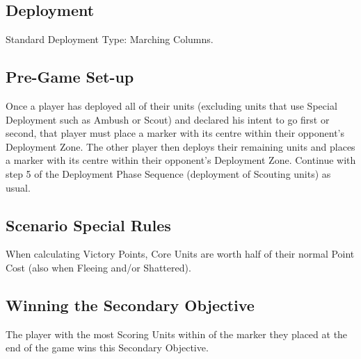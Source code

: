 
\label{TheLongMarchHome}


\subsection*{Deployment}

Standard Deployment Type: Marching Columns.


\subsection*{Pre-Game Set-up}

Once a player has deployed all of their units (excluding units that use Special Deployment such as Ambush or Scout) and declared his intent to go first or second, that player must place a marker with its centre within their opponent's Deployment Zone. The other player then deploys their remaining units and places a marker with its centre within their opponent's Deployment Zone. Continue with step 5 of the Deployment Phase Sequence (deployment of Scouting units) as usual.

\subsection*{Scenario Special Rules}

When calculating Victory Points, Core Units are worth half of their normal Point Cost (also when Fleeing and/or Shattered).

\subsection*{Winning the Secondary Objective}

The player with the most Scoring Units within  of the marker they placed at the end of the game wins this Secondary Objective. 

